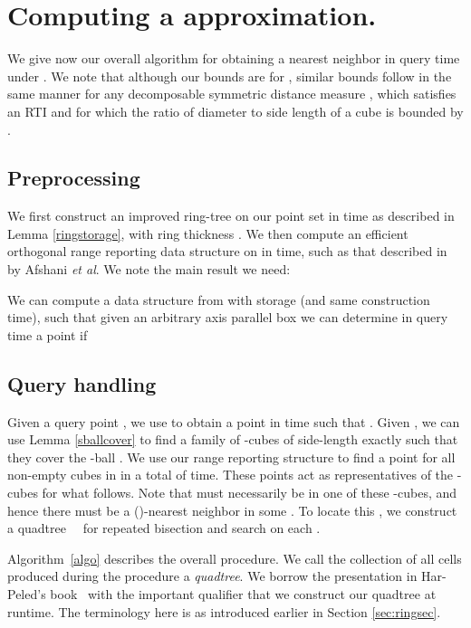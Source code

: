 \documentclass[11pt]{myclass}
\newcommand{\etal}{\emph{et al}\xspace}
\begin{document}
\section{Computing a  approximation.}
\label{sec:finalized-algorithm}
We give now our overall algorithm for obtaining a  nearest neighbor in  query time under . We note that although our bounds are for , similar bounds follow in the same manner for any decomposable symmetric distance measure , which satisfies an RTI and for which the ratio of diameter to side
length of a cube is bounded by . 

\subsection{Preprocessing}
We first construct an improved ring-tree  on our point set  in  time as 
described in Lemma \ref{ringstorage}, with ring thickness . 
We then compute an efficient orthogonal range reporting data structure on  in  time,
 such as that described in~\cite{rangesearching} by Afshani \etal. We note the main result we need: 

\begin{lemma}\label{rangesearch}
We can compute a data structure from  with  storage (and same construction time), such that given an arbitrary axis parallel box  we can determine in  query time a point  if 
\end{lemma} 

\subsection{Query handling}
Given a query point , we use  to obtain a point  in  time such that . 
Given , we can use Lemma \ref{sballcover} to find a 
family  of  -cubes of side-length exactly  such that
 they cover the -ball . We use our range reporting structure to find a 
point  for all non-empty cubes in  in a total of  time.
 These points act as representatives of the -cubes for what follows. Note that  must 
necessarily be in one of these -cubes, and hence there must be a ()-nearest 
neighbor  in some . To locate this , we 
construct a quadtree~\cite[Chapter 11]{snotes}~\cite{skipquadtrees} for repeated bisection and 
search on each .
 
Algorithm~\ref{algo} describes the overall procedure. 
We call the collection of all cells produced during the procedure a \emph{quadtree}.
We borrow the presentation in Har-Peled's book~\cite{snotes} with the important qualifier 
that we construct our quadtree at runtime. The terminology here is as introduced earlier in 
Section \ref{sec:ringsec}.
\end{document}
